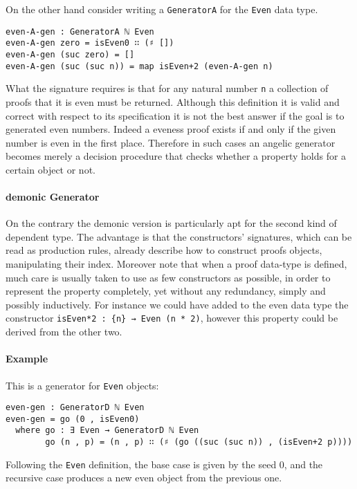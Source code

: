 \documentclass[10pt,a4paper]{article}
\begin{document}
On the other hand consider writing a \texttt{GeneratorA} for the \texttt{Even} data type.
\begin{verbatim}
even-A-gen : GeneratorA ℕ Even
even-A-gen zero = isEven0 ∷ (♯ [])
even-A-gen (suc zero) = []
even-A-gen (suc (suc n)) = map isEven+2 (even-A-gen n)
\end{verbatim}
What the signature requires is that for any natural number \texttt{n} a collection of proofs that it is even must be returned.
Although this definition it is valid and correct with respect to its specification
it is not the best answer if the goal is to generated even numbers.
Indeed a eveness proof exists if and only if the given number is even in the first place. Therefore in such cases an angelic generator becomes merely a decision procedure that checks whether a property holds for a certain object or not.

\paragraph{demonic Generator}
On the contrary the demonic version is particularly apt for the second kind of dependent type. The advantage is that the constructors' signatures, which can be read as production rules, already describe how to construct proofs objects, manipulating their index.
Moreover note that when a proof data-type is defined, much care is usually taken to use as few constructors as possible, in order to represent the property completely, yet without any redundancy, simply and possibly inductively. For instance we could have added to the even data type the constructor \texttt{isEven*2 :\ \{n\} → Even (n * 2)}, however this property could be derived from the other two.

\paragraph{Example}
This is a generator for \texttt{Even} objects:
\begin{verbatim}
even-gen : GeneratorD ℕ Even
even-gen = go (0 , isEven0)
  where go : ∃ Even → GeneratorD ℕ Even
        go (n , p) = (n , p) ∷ (♯ (go ((suc (suc n)) , (isEven+2 p))))
\end{verbatim}
Following the \texttt{Even} definition, the base case is given by the seed 0, and the recursive case produces a new even object from the previous one.
\end{document}
